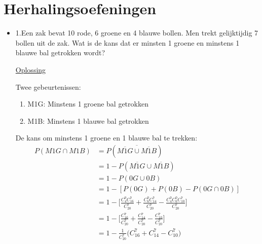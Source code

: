 \documentclass[12pt]{report}
\newcommand{\exercise}[2]{
  #1
  

  \underline{Oplossing}
  
  #2
  
    \hrulefill
}
\begin{document}
\chapter{Herhalingsoefeningen}
\begin{itemize}[label={}]
 \item {\exercise{1.Een zak bevat 10 rode, 6 groene en 4 blauwe bollen. Men trekt gelijktijdig 7 bollen uit de zak. Wat is de kans
 dat er minsten 1 groene en minstens 1 blauwe bal getrokken wordt?}{
 Twee gebeurtenissen: \begin{enumerate}
                       \item M1G: Minstens 1 groene bal getrokken
                       \item M1B: Minstens 1 blauwe bal getrokken
                      \end{enumerate}
 De kans om minstens 1 groene en 1 blauwe bal te trekken: 
 \begin{equation*}
  \begin{split}
   P(M1G \cap M1B) & = P(\overline{\overline{M1G} \cup \overline{M1B}}) \\
                   & = 1 - P(\overline{M1G} \cup \overline{M1B})        \\
                   & = 1 - P(0G \cup 0B) \\
                   & = 1 - [P(0G)+P(0B)-P(0G \cap 0B)] \\
                   & = 1 - \bigg[\frac{C_{4}^{0}C_{16}^{7}}{C_{20}^{7}} + \frac{C_{6}^{0}C_{14}^{7}}{C_{20}^{7}} - \frac{C_{4}^{0}C_{6}^{0}C_{10}^{7}}{C_{20}^{7}} \bigg] \\
                   & = 1 - \bigg[\frac{C_{16}^{7}}{C_{20}^{7}} + \frac{C_{14}^{7}}{C_{20}^{7}} - \frac{C_{10}^{7}}{C_{20}^{7}} \bigg] \\
                   & = 1 - \frac{1}{C_{20}^{7}}\bigg(C_{16}^{7} + C_{14}^{7} - C_{10}^{7}\bigg)
  \end{split}
 \end{equation*}

 }}
 

\end{itemize}
\end{document}

